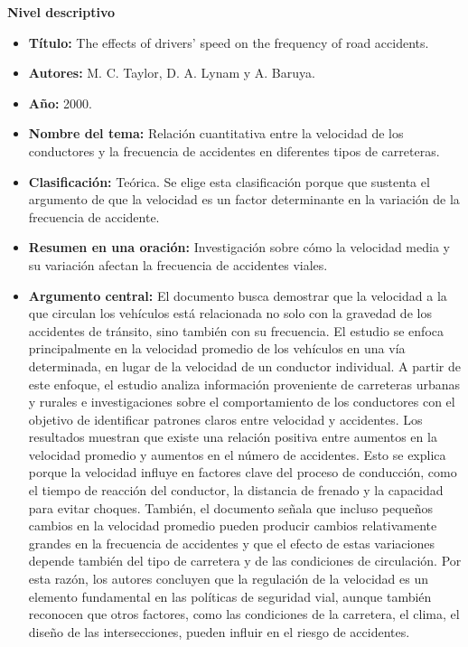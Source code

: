 \documentclass[12pt]{article}
\begin{document}
\textbf{Nivel descriptivo}
\begin{itemize}
    \item \textbf{Título:} The effects of drivers' speed on the frequency of road accidents. 
    
    \item \textbf{Autores:} M. C. Taylor, D. A. Lynam y A. Baruya. 
    
    \item \textbf{Año:} 2000. 
    
    \item \textbf{Nombre del tema:} Relación cuantitativa entre la velocidad de 
    los conductores y la frecuencia de accidentes en diferentes tipos de carreteras. 

    \item \textbf{Clasificación:} Teórica. Se elige esta clasificación porque que 
    sustenta el argumento de que la velocidad es un factor determinante en la variación 
    de la frecuencia de accidente. 

    \item \textbf{Resumen en una oración:} Investigación sobre cómo la velocidad 
    media y su variación afectan la frecuencia de accidentes viales. 

    \item \textbf{Argumento central:} El documento busca demostrar que la velocidad 
    a la que circulan los vehículos está relacionada no solo con la gravedad de los
    accidentes de tránsito, sino también con su frecuencia. El estudio se enfoca 
    principalmente en la velocidad promedio de los vehículos en una vía determinada,
    en lugar de la velocidad de un conductor individual. A partir de este enfoque,
    el estudio analiza información proveniente de carreteras urbanas y rurales e 
    investigaciones sobre el comportamiento de los conductores con el objetivo de 
    identificar patrones claros entre velocidad y accidentes. Los resultados muestran 
    que existe una relación positiva entre aumentos en la velocidad promedio y 
    aumentos en el número de accidentes. Esto se explica porque la velocidad influye 
    en factores clave del proceso de conducción, como el tiempo de reacción del conductor,
    la distancia de frenado y la capacidad para evitar choques. También, el documento 
    señala que incluso pequeños cambios en la velocidad promedio pueden producir 
    cambios relativamente grandes en la frecuencia de accidentes y que el efecto 
    de estas variaciones depende también del tipo de carretera y de las condiciones 
    de circulación. Por esta razón, los autores concluyen que la regulación  de la
    velocidad es un elemento fundamental en las políticas de seguridad vial, aunque
    también reconocen que otros factores, como las condiciones de la carretera, 
    el clima, el diseño de las intersecciones, pueden influir en el riesgo de accidentes. 
 

\end{itemize}
\end{document}

